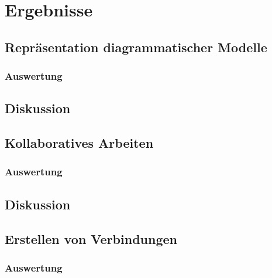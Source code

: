 
\section{Ergebnisse} %
\label{sec:ergebnisse}

\subsection{Repräsentation diagrammatischer Modelle} %
\label{sub:repräsentation_diagrammatischer_modelle}

\subsubsection{Auswertung} %

\subsection{Diskussion} %


\subsection{Kollaboratives Arbeiten} %
\label{sub:kollaboratives_arbeiten}

\subsubsection{Auswertung} %

\subsection{Diskussion} %


\subsection{Erstellen von Verbindungen} %
\label{sub:erstellen_von_verbindungen}

\subsubsection{Auswertung} %

